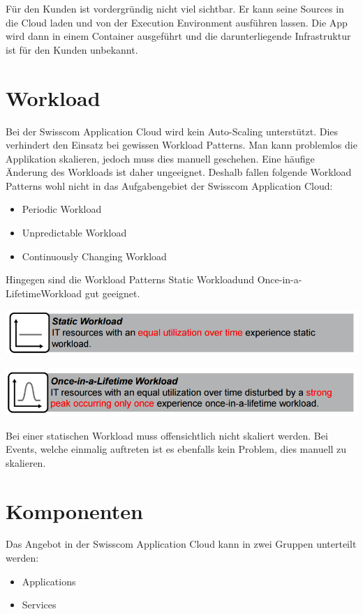 Für den Kunden ist vordergründig nicht viel sichtbar. Er kann seine Sources in die Cloud laden und von der Execution Environment ausführen lassen. Die App wird dann in einem Container ausgeführt und die darunterliegende Infrastruktur ist für den Kunden unbekannt. 

\section{Workload}
Bei der Swisscom Application Cloud wird kein Auto-Scaling unterstützt. Dies verhindert den Einsatz bei gewissen Workload Patterns. Man kann problemlos die Applikation skalieren, jedoch muss dies manuell geschehen. Eine häufige Änderung des Workloads ist daher ungeeignet. Deshalb fallen folgende Workload Patterns wohl nicht in das Aufgabengebiet der Swisscom Application Cloud:
\begin{itemize}
\item Periodic Workload
\item Unpredictable Workload
\item Continuously Changing Workload
\end{itemize}

Hingegen sind die Workload Patterns \glqq Static Workload\grqq und \glqq Once-in-a-Lifetime\grqq Workload gut geeignet.

\includegraphics[scale=0.6]{images/static-workload.png}

\includegraphics[scale=0.6]{images/once-lifetime.png}

Bei einer statischen Workload muss offensichtlich nicht skaliert werden. Bei Events, welche einmalig auftreten ist es ebenfalls kein Problem, dies manuell zu skalieren.

\section{Komponenten}
Das Angebot in der Swisscom Application Cloud kann in zwei Gruppen unterteilt werden:
\begin{itemize}
\item Applications
\item Services
\end{itemize}

